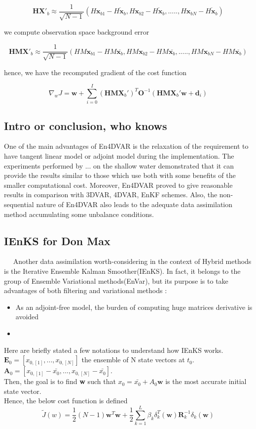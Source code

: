\documentclass[a4,12pt]{article}
\begin{document}
$$\textbf{HX}'_{b} \approx \frac{1}{\sqrt{N-1}}(H\textbf{x}_{b1}-\overline{H\textbf{x}_{b}},H\textbf{x}_{b2}-\overline{H\textbf{x}_{b}},.....,H\textbf{x}_{bN}-\overline{H\textbf{x}_{b}})$$

we compute observation space background error

$$\textbf{HMX}'_{b} \approx \frac{1}{\sqrt{N-1}}(HM\textbf{x}_{b1}-HM\overline{\textbf{x}_{b}}, HM\textbf{x}_{b2}-HM\overline{\textbf{x}_{b}},.....,HM\textbf{x}_{bN}-HM\overline{\textbf{x}_{b}} )$$

hence, we have the recomputed gradient of the cost function

$$\nabla _{w}J = \textbf{w} + \sum_{i=0}^{I}(\textbf{HMX}_{b}')^{T}\textbf{O}^{-1}(\textbf{HMX}_{b}'\textbf{w}+\textbf{d}_{i})$$

\subsection{Intro or conclusion, who knows}

One of the main advantages of En4DVAR is the relaxation of the requirement to have tangent linear model or adjoint model during the implementation. The experiments performed by ... on the shallow water demonstrated that it can  provide the results similar to those which use both with some benefits of the smaller computational cost. Moreover, En4DVAR proved to give reasonable results in comparison with 3DVAR, 4DVAR, EnKF schemes. Also, the non-sequential nature of En4DVAR also leads to the adequate data assimilation method accumulating some unbalance conditions.  

\subsection{IEnKS for Don Max}
~~ Another data assimilation worth-considering in the context of Hybrid methods is the Iterative Ensemble Kalman Smoother(IEnKS). In fact, it belongs to the group of Ensemble Variational methods(EnVar), but its purpose is to take advantages of both filtering and variational methods :
\begin{itemize}
\item As an adjoint-free model, the burden of computing huge matrices derivative is avoided
\item 
\end{itemize}

Here are briefly stated a few notations to understand how IEnKS works. \\
$\textbf{E}_0 = [x_{0,[1]},...,x_{0,[N]}]$ the ensemble of N state vectors at $t_0$. \\
$\textbf{A}_0 = [x_{0,[1]} - \bar{x_0},...,x_{0,[N]}- \bar{x_0}]$. \\
Then, the goal is to find \textbf{w} such that $x_0 = \bar{x_0} + A_0 \textbf{w}$ is the most accurate initial state vector. \\
Hence, the below cost function is defined 
$$\tilde{J}(w) = \frac{1}{2}(N-1)\textbf{w}^{T}\textbf{w} + \frac{1}{2}\sum_{k=1}^{L}\beta_{k}\delta_{k}^{T}(\textbf{w})\textbf{R}_{k}^{-1}\delta_{k}(\textbf{w})$$
\end{document}

